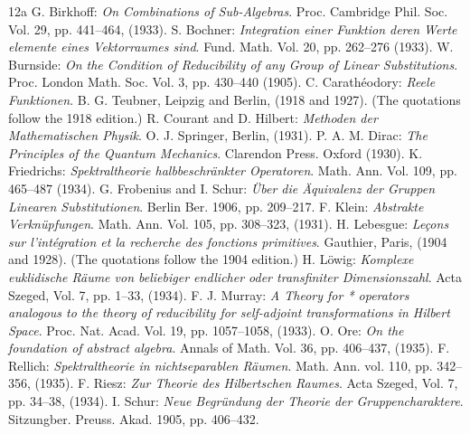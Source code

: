 \documentclass[12pt,b5paper,twoside]{article}
\begin{document}
{}
\renewcommand{\contentsname}{Contents}
\tableofcontents

{}
\renewcommand{\refname}{Bibliography}
\begin{thebibliography}{12a}
 G. Birkhoff: \emph{On Combinations of Sub-Algebras}. Proc. Cambridge Phil. Soc. Vol. 29, pp. 441--464, (1933).
 S. Bochner: \emph{Integration einer Funktion deren Werte elemente eines Vektorraumes sind}. Fund. Math. Vol. 20, pp. 262--276 (1933).
 W. Burnside: \emph{On the Condition of Reducibility of any Group of Linear Substitutions}. Proc. London Math. Soc. Vol. 3, pp. 430--440 (1905).
 C. Carath\'eodory: \emph{Reele Funktionen}. B. G. Teubner, Leipzig and Berlin, (1918 and 1927). (The quotations follow the 1918 edition.)
 R. Courant and D. Hilbert: \emph{Methoden der Mathematischen Physik}. O. J. Springer, Berlin, (1931).
 P. A. M. Dirac: \emph{The Principles of the Quantum Mechanics}. Clarendon Press. Oxford (1930).
 K. Friedrichs: \emph{Spektraltheorie halbbeschr\"ankter Operatoren}. Math. Ann. Vol. 109, pp. 465--487 (1934).
 G. Frobenius and I. Schur: \emph{\"Uber die \"Aquivalenz der Gruppen Linearen Substitutionen}. Berlin Ber. 1906, pp. 209--217.
 F. Klein: \emph{Abstrakte Verkn\"upfungen}. Math. Ann. Vol. 105, pp. 308--323, (1931).
 H. Lebesgue: \emph{Le\c{c}ons sur l'int\'egration et la recherche des fonctions primitives}. Gauthier, Paris, (1904 and 1928). (The quotations follow the 1904 edition.)
 H. L\"owig: \emph{Komplexe euklidische R\"aume von beliebiger endlicher oder transfiniter Dimensionszahl}. Acta Szeged, Vol. 7, pp. 1--33, (1934).
 F. J. Murray: \emph{A Theory for * operators analogous to the theory of reducibility for self-adjoint transformations in Hilbert Space}. Proc. Nat. Acad. Vol. 19, pp. 1057--1058, (1933).
 O. Ore: \emph{On the foundation of abstract algebra}. Annals of Math. Vol. 36, pp. 406--437, (1935).
 F. Rellich: \emph{Spektraltheorie in nichtseparablen R\"aumen}. Math. Ann. vol. 110, pp. 342--356, (1935).
 F. Riesz: \emph{Zur Theorie des Hilbertschen Raumes}. Acta Szeged, Vol. 7, pp. 34--38, (1934).
 I. Schur: \emph{Neue Begr\"undung der Theorie der Gruppencharaktere}. Sitzungber. Preuss. Akad. 1905, pp. 406--432.

\end{thebibliography}
\end{document}

